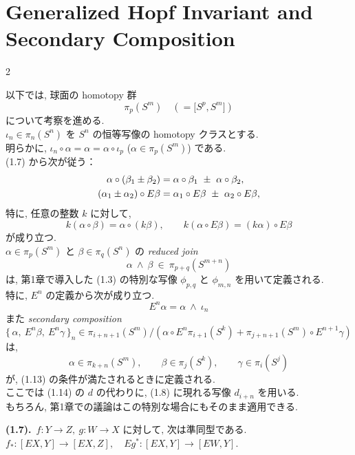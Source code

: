 \documentclass[10pt, leqno]{ltjsarticle} %
\author{}
\date{}
\newcommand{\redjoin}{\wedge}
\newcommand{\todai}[2][]{\{\,#2\,\}_{#1}}      %
\newcommand{\hs}[2]{\bigl[#1,#2\bigr]}   %
\newcommand{\pis}[2]{\pi_{#1}(#2)}       %
\numberwithin{equation}{section}
\theoremstyle{plain}
\theoremstyle{definition}
\theoremstyle{remark}
\begin{document}
\setcounter{section}{1}
\section{Generalized Hopf Invariant and Secondary Composition}

\begin{paracol}{2}

以下では, 球面の homotopy 群
\[
\pis{p}{S^m} \quad(=\hs{S^p}{S^m})
\]
について考察を進める. \\
$\iota_n\in\pis{n}{S^n}$ を $S^n$ の恒等写像の homotopy クラスとする. \\
明らかに, 
$\iota_n\circ\alpha=\alpha=\alpha\circ\iota_p$ ($\alpha\in\pis{p}{S^m}$) である. \\
(1.7) から次が従う：
\begin{equation}\label{eq:2.1}
\raisetag{3ex}
\begin{aligned}[t]
\alpha\circ(\beta_1\pm\beta_2)
&=\alpha\circ\beta_1\ \pm\ \alpha\circ\beta_2,\\
(\alpha_1\pm\alpha_2)\circ E\beta
&=\alpha_1\circ E\beta\ \pm\ \alpha_2\circ E\beta,
\end{aligned}
\end{equation}
特に, 任意の整数 $k$ に対して,
\[
k(\alpha\circ\beta)=\alpha\circ(k\beta),\qquad
k(\alpha\circ E\beta)=(k\alpha)\circ E\beta
\]
が成り立つ. \\
$\alpha\in\pis{p}{S^m}$ と $\beta\in\pis{q}{S^n}$ の \emph{reduced join}
\[
\alpha\ \redjoin\ \beta\ \in\ \pis{p+q}{S^{m+n}}
\]
は, 第1章で導入した (1.3) の特別な写像 
$\phi_{p,q}$ と $\phi_{m,n}$ を用いて定義される. \\
特に, $E^n$ の定義から次が成り立つ. 
\[
E^n\alpha=\alpha\ \redjoin\ \iota_n
\]
また \emph{secondary composition}
\[
\todai[n]{\alpha,\ E^n\beta,\ E^n\gamma}
\in\pi_{i+n+1}(S^m) / 
(\alpha\circ E^n\pi_{i+1}(S^k) + \pi_{j+n+1}(S^m)\circ E^{n+1}\gamma)
\]
は, 
\[
\alpha\in\pis{k+n}{S^m},\qquad
\beta\in\pis{j}{S^k},\qquad
\gamma\in\pis{i}{S^j}
\]
が, (1.13) の条件が満たされるときに定義される. \\
ここでは (1.14) の $d$ の代わりに, (1.8) に現れる写像 $d_{i+n}$ を用いる. \\
もちろん, 第1章での議論はこの特別な場合にもそのまま適用できる. 

\switchcolumn

\noindent
\textbf{(1.7).}\
\(f:Y\to Z,\ g:W\to X \text{ に対して, 次は準同型である.}\)\\
\(
f_*:[EX, Y] \to [EX,Z],\quad Eg^*:[EX,Y]\to[EW,Y].
\)


\end{paracol}
\end{document}
